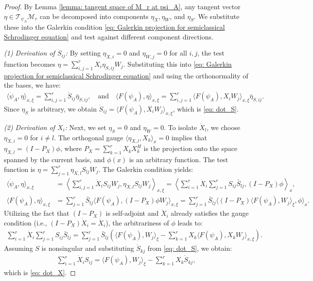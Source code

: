 \documentclass[preprint,11pt]{elsarticle}
\begin{document}
\begin{proof}
    By Lemma \ref{lemma: tangent space of M_r at psi_A}, any tangent vector $\eta \in \mathcal{T}_{\psi_A}\mathcal{M}_r$ can be decomposed into components $\eta_X, \eta_W$, and $\eta_S$. We substitute these into the Galerkin condition \eqref{eq: Galerkin projection for semiclassical Schrodinger equation} and test against different component directions.

    \textit{(1) Derivation of $\dot{S}_{ij}$:} 
    By setting $\eta_{X,i} = 0$ and $\eta_{W,j} = 0$ for all $i,j$, the test function becomes $\eta = \sum_{i,j=1}^{r} X_i \eta_{S,ij} W_j$. Substituting this into \eqref{eq: Galerkin projection for semiclassical Schrodinger equation} and using the orthonormality of the bases, we have:
    \begin{align*}
        \langle \dot{\psi}_A, \eta \rangle_{x,\xi} = \sum_{i,j=1}^r \dot{S}_{ij} \bar{\eta}_{S,ij}, \quad \text{and} \quad \langle F(\psi_A), \eta \rangle_{x,\xi} = \sum_{i,j=1}^r \langle F(\psi_A), X_i W_j \rangle_{x,\xi} \bar{\eta}_{S,ij}.
    \end{align*}
    Since $\eta_S$ is arbitrary, we obtain $\dot{S}_{ij} = \langle F(\psi_A), X_i W_j \rangle_{x,\xi}$, which is \eqref{eq: dot_S}.

    \textit{(2) Derivation of $\dot{X}_i$:} 
    Next, we set $\eta_{S} = 0$ and $\eta_{W} = 0$. To isolate $\dot{X}_l$, we choose $\eta_{X,i} = 0$ for $i \neq l$. The orthogonal gauge $\langle \eta_{X,l}, X_k \rangle_x = 0$ implies that $\eta_{X,l} = (I - P_X) \phi$, where $P_X = \sum_{k=1}^r X_k X_k^H$ is the projection onto the space spanned by the current basis, and $\phi(x)$ is an arbitrary function. The test function is $\eta = \sum_{j=1}^r \eta_{X,l} S_{lj} W_j$.
    The Galerkin condition yields:
    \begin{align*}
        \langle \dot{\psi}_A, \eta \rangle_{x,\xi} &= \left\langle \sum_{i,j=1}^r \dot{X}_i S_{ij} W_j, \eta_{X,l} S_{lj} W_j \right\rangle_{x,\xi} = \left\langle \sum_{i=1}^r \dot{X}_i \sum_{j=1}^r S_{ij} \bar{S}_{lj}, (I - P_X) \phi \right\rangle_x, \\
        \langle F(\psi_A), \eta \rangle_{x,\xi} &= \sum_{j=1}^r \bar{S}_{lj} \langle F(\psi_A), (I - P_X) \phi W_j \rangle_{x,\xi} = \sum_{j=1}^r \bar{S}_{lj} \langle (I - P_X) \langle F(\psi_A), W_j \rangle_\xi, \phi \rangle_x.
    \end{align*}
    Utilizing the fact that $(I-P_X)$ is self-adjoint and $\dot{X}_i$ already satisfies the gauge condition (i.e., $(I-P_X)\dot{X}_i = \dot{X}_i$), the arbitrariness of $\phi$ leads to:
    \begin{align*}
        \sum_{i=1}^r \dot{X}_i \sum_{j=1}^r S_{ij} \bar{S}_{lj} = \sum_{j=1}^r \bar{S}_{lj} \left( \langle F(\psi_A), W_j \rangle_\xi - \sum_{k=1}^r X_k \langle F(\psi_A), X_k W_j \rangle_{x,\xi} \right).
    \end{align*}
    Assuming $S$ is nonsingular and substituting $\dot{S}_{kj}$ from \eqref{eq: dot_S}, we obtain:
    \begin{align*}
        \sum_{i=1}^r \dot{X}_i S_{ij} = \langle F(\psi_A), W_j \rangle_\xi - \sum_{k=1}^r X_k \dot{S}_{kj},
    \end{align*}
    which is \eqref{eq: dot_X}.


\end{proof}
\end{document}
